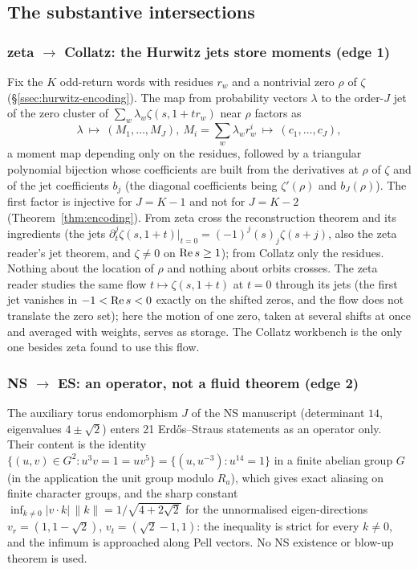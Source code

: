 \subsection{The substantive intersections}

\subsubsection{zeta \texorpdfstring{$\to$}{to} Collatz: the Hurwitz jets store moments (edge 1)}\label{ssec:zeta-cz}
Fix the $K$ odd-return words with residues $r_w$ and a nontrivial zero $\rho$ of $\zeta$ (§\ref{ssec:hurwitz-encoding}). The map from probability vectors $\lambda$ to the order-$J$ jet of the zero cluster of $\sum_w\lambda_w\zeta(s,1+tr_w)$ near $\rho$ factors as
\[
\lambda\ \longmapsto\ (M_1,\dots,M_J),\ M_i=\textstyle\sum_w\lambda_wr_w^i\ \longmapsto\ (c_1,\dots,c_J),
\]
a moment map depending only on the residues, followed by a triangular polynomial bijection whose coefficients are built from the derivatives at $\rho$ of $\zeta$ and of the jet coefficients $b_j$ (the diagonal coefficients being $\zeta'(\rho)$ and $b_J(\rho)$). The first factor is injective for $J=K-1$ and not for $J=K-2$ (Theorem~\ref{thm:encoding}). From zeta cross the reconstruction theorem and its ingredients (the jets $\partial_t^j\zeta(s,1+t)|_{t=0}=(-1)^j(s)_j\zeta(s+j)$, also the zeta reader's jet theorem, and $\zeta\ne0$ on $\operatorname{Re} s\ge1$); from Collatz only the residues. Nothing about the location of $\rho$ and nothing about orbits crosses. The zeta reader studies the same flow $t\mapsto\zeta(s,1+t)$ at $t=0$ through its jets (the first jet vanishes in $-1<\operatorname{Re} s<0$ exactly on the shifted zeros, and the flow does not translate the zero set); here the motion of one zero, taken at several shifts at once and averaged with weights, serves as storage. The Collatz workbench is the only one besides zeta found to use this flow.

\subsubsection{NS \texorpdfstring{$\to$}{to} ES: an operator, not a fluid theorem (edge 2)}
The auxiliary torus endomorphism $J$ of the NS manuscript (determinant $14$, eigenvalues $4\pm\sqrt2$) enters 21 Erdős--Straus statements as an operator only. Their content is the identity $\{(u,v)\in G^2:u^3v=1=uv^5\}=\{(u,u^{-3}):u^{14}=1\}$ in a finite abelian group $G$ (in the application the unit group modulo $R_a$), which gives exact aliasing on finite character groups, and the sharp constant $\inf_{k\ne0}|v\cdot k|\,\|k\|=1/\sqrt{4+2\sqrt2}$ for the unnormalised eigen-directions $v_r=(1,1-\sqrt2)$, $v_t=(\sqrt2-1,1)$: the inequality is strict for every $k\ne0$, and the infimum is approached along Pell vectors. No NS existence or blow-up theorem is used.


